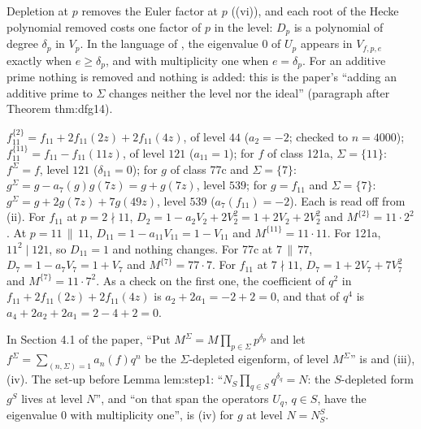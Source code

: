 \begin{remark}\label{rem:hecke:why-delta}
Depletion at $p$ removes the Euler factor at $p$ ((vi)), and each root of the Hecke polynomial removed costs one factor of $p$ in the level: $D_p$ is a polynomial
of degree $\delta_p$ in $V_p$. In the language of , the eigenvalue $0$ of $U_p$ appears in $V_{f,p,e}$ exactly when $e\ge\delta_p$, and with multiplicity one when
$e=\delta_p$. For an additive prime nothing is removed and nothing is added: this is the paper's ``adding an additive prime to $\Sigma$ changes neither the level nor the ideal''
(paragraph after Theorem thm:dfg14).
\end{remark}

\begin{example}\label{ex:hecke:depleted}
$f_{11}^{\{2\}}=f_{11}+2f_{11}(2z)+2f_{11}(4z)$, of level $44$ ($a_2=-2$; checked to $n=4000$); $f_{11}^{\{11\}}=f_{11}-f_{11}(11z)$, of level $121$ ($a_{11}=1$); for $f$ of class 121a, $\Sigma=\{11\}$:
$f^\Sigma=f$, level $121$ ($\delta_{11}=0$); for $g$ of class 77c and $\Sigma=\{7\}$: $g^\Sigma=g-a_7(g)g(7z)=g+g(7z)$, level $539$; for $g=f_{11}$ and $\Sigma=\{7\}$: $g^\Sigma=g+2g(7z)+7g(49z)$, level $539$
($a_7(f_{11})=-2$). Each is read off from (ii). For $f_{11}$ at $p=2\nmid11$, $D_2=1-a_2V_2+2V_2^2=1+2V_2+2V_2^2$ and $M^{\{2\}}=11\cdot2^2$. At $p=11\,\|\,11$,
$D_{11}=1-a_{11}V_{11}=1-V_{11}$ and $M^{\{11\}}=11\cdot11$. For 121a, $11^2\mid121$, so $D_{11}=1$ and nothing changes. For 77c at $7\,\|\,77$, $D_7=1-a_7V_7=1+V_7$ and
$M^{\{7\}}=77\cdot7$. For $f_{11}$ at $7\nmid11$, $D_7=1+2V_7+7V_7^2$ and $M^{\{7\}}=11\cdot7^2$. As a check on the first one, the coefficient of $q^2$ in
$f_{11}+2f_{11}(2z)+2f_{11}(4z)$ is $a_2+2a_1=-2+2=0$, and that of $q^4$ is $a_4+2a_2+2a_1=2-4+2=0$.
\end{example}

\begin{paperlink}\label{pl:hecke:section41}
In Section 4.1 of the paper, ``Put $M^\Sigma=M\prod_{p\in\Sigma}p^{\delta_p}$ and let $f^\Sigma=\sum_{(n,\Sigma)=1}a_n(f)q^n$ be the $\Sigma$-depleted eigenform, of level $M^\Sigma$'' is
 and (iii), (iv). The set-up before Lemma lem:step1: ``$N_S\prod_{q\in S}q^{\delta_q}=N$: the $S$-depleted form $g^S$ lives at level
$N$'', and ``on that span the operators $U_q$, $q\in S$, have the eigenvalue $0$ with multiplicity one'', is (iv) for $g$ at level $N=N_S^S$.
\end{paperlink}

